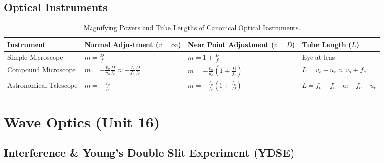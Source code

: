 \documentclass[10pt,twoside,openright]{book}
\begin{document}
\subsection{Optical Instruments}

\begin{table}[htbp]
\centering
\footnotesize
\setlength{\tabcolsep}{3pt}
\renewcommand{\arraystretch}{1.2}
\begin{tabularx}{\textwidth}{>{\hsize}L >{\hsize}Y >{\hsize}Y >{\hsize}Y}
\toprule
\textbf{Instrument} & \textbf{Normal Adjustment ($v = \infty$)} & \textbf{Near Point Adjustment ($v = D$)} & \textbf{Tube Length ($L$)} \\
\midrule
Simple Microscope & $m = \frac{D}{f}$ & $m = 1 + \frac{D}{f}$ & Eye at lens \\
Compound Microscope & $m = -\frac{v_o}{u_o}\frac{D}{f_e} \approx -\frac{L}{f_o}\frac{D}{f_e}$ & $m = -\frac{v_o}{u_o}\left(1 + \frac{D}{f_e}\right)$ & $L = v_o + u_e \approx v_o + f_e$ \\
Astronomical Telescope & $m = -\frac{f_o}{f_e}$ & $m = -\frac{f_o}{f_e}\left(1 + \frac{f_e}{D}\right)$ & $L = f_o + f_e \quad \text{or} \quad f_o + u_e$ \\
\bottomrule
\end{tabularx}
\caption{Magnifying Powers and Tube Lengths of Canonical Optical Instruments.}
\end{table}

\newpage

\section{Wave Optics (Unit 16)}

\subsection{Interference \& Young's Double Slit Experiment (YDSE)}
\end{document}
